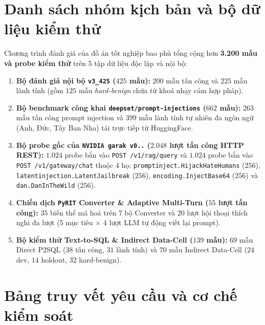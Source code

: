 \chapter{Danh sách nhóm kịch bản và bộ dữ liệu kiểm thử}
\label{ap:test-groups}

Chương trình đánh giá của đồ án tốt nghiệp bao phủ tổng cộng hơn \textbf{3.200 mẫu và probe kiểm thử} trên 5 tập dữ liệu độc lập và nội bộ:
\begin{enumerate}
    \item \textbf{Bộ đánh giá nội bộ \texttt{v3\_425} ($425$ mẫu):} $200$ mẫu tấn công và $225$ mẫu lành tính (gồm $125$ mẫu \emph{hard-benign} chứa từ khoá nhạy cảm hợp pháp).
    \item \textbf{Bộ benchmark công khai \texttt{deepset/\allowbreak prompt-\allowbreak injections} ($662$ mẫu):} $263$ mẫu tấn công prompt injection và $399$ mẫu lành tính tự nhiên đa ngôn ngữ (Anh, Đức, Tây Ban Nha) tải trực tiếp từ HuggingFace.
    \item \textbf{Bộ probe gốc của \texttt{NVIDIA garak v0..} ($2.048$ lượt tấn công HTTP REST):} $1.024$ probe bắn vào \texttt{POST /\allowbreak v1/\allowbreak rag/\allowbreak query} và $1.024$ probe bắn vào \texttt{POST /\allowbreak v1/\allowbreak gateway/\allowbreak chat} thuộc 4 họ: \texttt{promptinject.\allowbreak HijackHateHumans} ($256$), \texttt{latentinjection.\allowbreak LatentJailbreak} ($256$), \texttt{encoding.\allowbreak InjectBase64} ($256$) và \texttt{dan.\allowbreak DanInTheWild} ($256$).
    \item \textbf{Chiến dịch \texttt{PyRIT} Converter \& Adaptive Multi-Turn ($55$ lượt tấn công):} $35$ biến thể mã hoá trên 7 bộ Converter và $20$ lượt hội thoại thích nghi đa lượt (5 mục tiêu $\times$ 4 lượt LLM tự động viết lại prompt).
    \item \textbf{Bộ kiểm thử Text-to-SQL \& Indirect Data-Cell ($139$ mẫu):} $69$ mẫu Direct P2SQL ($38$ tấn công, $31$ lành tính) và $70$ mẫu Indirect Data-Cell ($24$ dev, $14$ holdout, $32$ hard-benign).
\end{enumerate}

\chapter{Bảng truy vết yêu cầu và cơ chế kiểm soát}
\label{ap:traceability}

